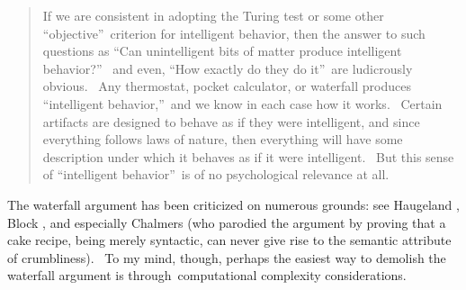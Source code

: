 \documentclass[11pt,onecolumn]{article}%
\begin{document}
\begin{quotation}
\noindent If we are consistent in adopting the Turing test or some other
\textquotedblleft objective\textquotedblright\ criterion for intelligent
behavior, then the answer to such questions as \textquotedblleft Can
unintelligent bits of matter produce intelligent behavior?\textquotedblright%
\ and even, \textquotedblleft How exactly do they do it\textquotedblright\ are
ludicrously obvious. \ Any thermostat, pocket calculator, or waterfall
produces \textquotedblleft intelligent behavior,\textquotedblright\ and we
know in each case how it works. \ Certain artifacts are designed to behave as
if they were intelligent, and since everything follows laws of nature, then
everything will have some description under which it behaves as if it were
intelligent. \ But this sense of \textquotedblleft intelligent
behavior\textquotedblright\ is of no psychological relevance at all.
\end{quotation}

The waterfall argument has been criticized on numerous grounds: see Haugeland
\cite{haugeland}, Block \cite{block}, and especially Chalmers \cite{chalmers}
(who parodied the argument by proving that a cake recipe, being merely
syntactic, can never give rise to the semantic attribute of crumbliness). \ To
my mind, though, perhaps the easiest way to demolish the waterfall argument is
through\ computational complexity considerations.
\end{document}

